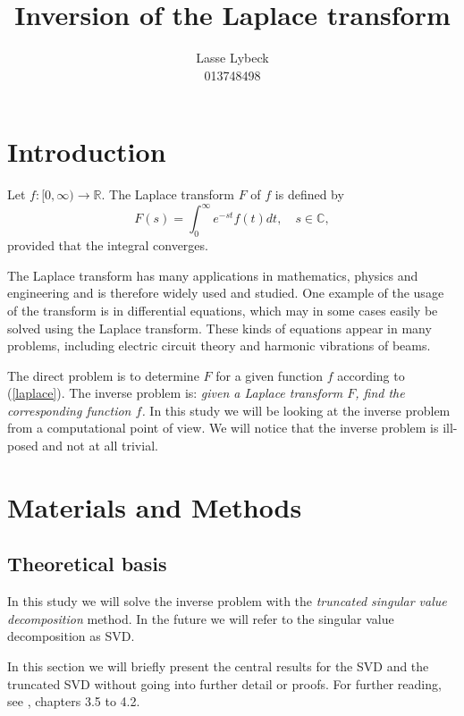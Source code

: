 \documentclass[12pt,a4]{article}
\title{Inversion of the Laplace transform}
\author{Lasse Lybeck\\013748498}
\newcommand{\R}{{\mathbb R}}
\newcommand{\C}{{\mathbb C}}
\begin{document}
\maketitle

\section{Introduction}

Let $f:[0,\infty)\rightarrow \R$. The Laplace transform $F$ of $f$ is defined by
\begin{equation}\label{laplace}
 F(s) = \int_0^\infty e^{-st}f(t)dt,\quad s\in\C ,
\end{equation}
provided that the integral converges.

The Laplace transform has many applications in mathematics, physics and engineering and is therefore widely used and studied. One example of the usage of the transform is in differential equations, which may in some cases easily be solved using the Laplace transform. These kinds of equations appear in many problems, including electric circuit theory and harmonic vibrations of beams. \cite{laplaceweb} \cite{transformsbook}

The direct problem is to determine $F$ for a given function $f$ according to (\ref{laplace}). The inverse problem is: {\em given a Laplace transform $F$, find the corresponding function $f$.} In this study we will be looking at the inverse problem from a computational point of view. We will notice that the inverse problem is ill-posed and not at all trivial.




\section{Materials and Methods}\label{sec:methods}

\subsection{Theoretical basis}

In this study we will solve the inverse problem with the \emph{truncated singular value decomposition} method. In the future we will refer to the singular value decomposition as SVD.

In this section we will briefly present the central results for the SVD and the truncated SVD without going into further detail or proofs. For further reading, see \cite{samu}, chapters 3.5 to 4.2.
\end{document}
